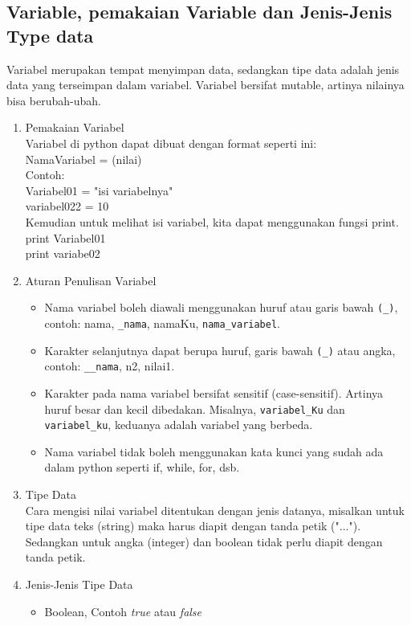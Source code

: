 \subsection{Variable, pemakaian Variable dan Jenis-Jenis Type data}
Variabel merupakan tempat menyimpan data, sedangkan tipe data adalah jenis data yang terseimpan dalam variabel. Variabel bersifat mutable, artinya nilainya bisa berubah-ubah.
\begin{enumerate}
\item Pemakaian Variabel\\
Variabel di python dapat dibuat dengan format seperti ini:\\
NamaVariabel = (nilai)\\
Contoh:\\
Variabel01 = "isi variabelnya"\\
variabel022 = 10\\
Kemudian untuk melihat isi variabel, kita dapat menggunakan fungsi print.\\
print Variabel01\\
print variabe02\\
\item Aturan Penulisan Variabel
\begin{itemize}
\item Nama variabel boleh diawali menggunakan huruf atau garis bawah \verb|(_)|, contoh: nama, \verb|_nama|, namaKu, \verb|nama_variabel|.
\item Karakter selanjutnya dapat berupa huruf, garis bawah \verb|(_)| atau angka, contoh: \verb|__nama|, n2, nilai1.
\item Karakter pada nama variabel bersifat sensitif (case-sensitif). Artinya huruf besar dan kecil dibedakan. Misalnya, \verb|variabel_Ku| dan \verb|variabel_ku|, keduanya adalah variabel yang berbeda.
\item Nama variabel tidak boleh menggunakan kata kunci yang sudah ada dalam python seperti if, while, for, dsb.
\end{itemize}
\item Tipe Data\\
Cara mengisi nilai variabel ditentukan dengan jenis datanya, misalkan untuk tipe data teks (string) maka harus diapit dengan tanda petik ("..."). Sedangkan untuk angka (integer) dan boolean tidak perlu diapit dengan tanda petik.\\
\item Jenis-Jenis Tipe Data\\
\begin{itemize}
\item Boolean, Contoh \textit{true} atau \textit{false}

\end{itemize}
\end{enumerate}
